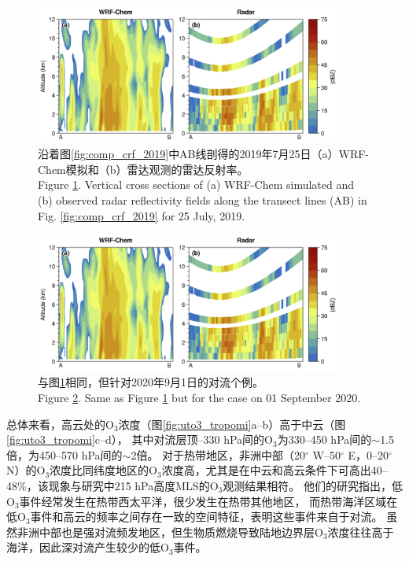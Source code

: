 \begin{figure}[H]
\centering
\includegraphics[width=0.9\textwidth]{./figures/comp_dbzcross_2019.png}
\caption{沿着图\ref{fig:comp_crf_2019}中AB线剖得的2019年7月25日（a）WRF-Chem模拟和（b）雷达观测的雷达反射率。\\
Figure \ref{fig:comp_dbzcross_2019}. Vertical cross sections of (a) WRF-Chem simulated and (b) observed radar reflectivity fields along the transect lines (AB) in Fig. \ref{fig:comp_crf_2019} for 25 July, 2019.}
\label{fig:comp_dbzcross_2019}
\end{figure}

\begin{figure}[H]
\centering
\includegraphics[width=0.9\textwidth]{./figures/comp_dbzcross_2019.png}
\caption{与图\ref{fig:comp_dbzcross_2019}相同，但针对2020年9月1日的对流个例。\\
Figure \ref{fig:comp_dbzcross_2020}. Same as Figure \ref{fig:comp_dbzcross_2019} but for the case on 01 September 2020.}
\label{fig:comp_dbzcross_2020}
\end{figure}

总体来看，高云处的O$_3$浓度（图\ref{fig:uto3_tropomi}a--b）高于中云（图\ref{fig:uto3_tropomi}c--d），
其中对流层顶--330 hPa间的O$_3$为330--450 hPa间的$\sim$1.5倍，为450--570 hPa间的$\sim$2倍。
对于热带地区，非洲中部（20$^{\circ}$ W--50$^{\circ}$ E，0--20$^{\circ}$ N）的O$_3$浓度比同纬度地区的O$_3$浓度高，尤其是在中云和高云条件下可高出40--48\%，该现象与\citet{Cooper.2013}研究中215 hPa高度MLS的O$_3$观测结果相符。
他们的研究指出，低O$_3$事件经常发生在热带西太平洋，很少发生在热带其他地区，
而热带海洋区域在低O$_3$事件和高云的频率之间存在一致的空间特征，表明这些事件来自于对流。
虽然非洲中部也是强对流频发地区，但生物质燃烧导致陆地边界层O$_3$浓度往往高于海洋\citep{Thompson.2001,Anderson.2016}，因此深对流产生较少的低O$_3$事件。

